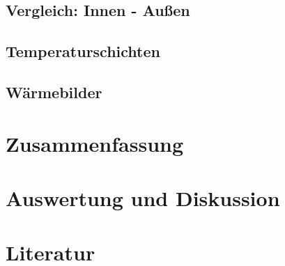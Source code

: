 \documentclass[11pt,a4paper]{scrartcl}
\begin{document}
\subsection{Vergleich: Innen - Außen}
\subsection{Temperaturschichten}
\subsection{Wärmebilder}

\section{Zusammenfassung}

\section{Auswertung und Diskussion}

\section{Literatur}
\end{document}
